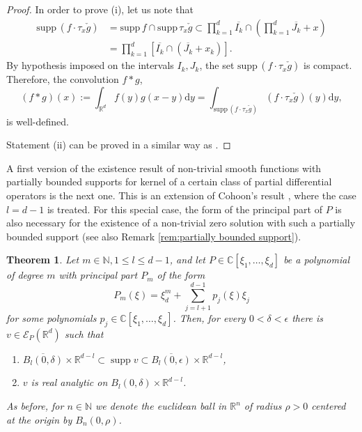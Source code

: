 \documentclass[a4paper,10pt]{amsart}
\newtheorem{theorem}{Theorem}
\newtheorem*{crucial lemma}{Lemma \ref{lem:nice polynomial2}}
\theoremstyle{definition}
\newcommand{\R}{\mathbb{R}}
\newcommand{\C}{\mathbb{C}}
\newcommand{\N}{\mathbb{N}}
\newcommand{\supp}{\mbox{supp}\,}
\begin{document}
\begin{proof}
	In order to prove (i), let us note that
	\begin{align*}
		\supp(f\cdot\tau_x\check g)&=\supp f\cap\supp \tau_x\check g
		\subset\prod_{k=1}^d \overline{I_k}\cap\left(\prod_{k=1}^d \overline{J_k}+x\right)\\
		&=\prod_{k=1}^d \left[\overline{I_k}\cap (\overline{J_k}+x_k)\right].
	\end{align*}
	By hypothesis imposed on the intervals $I_k, J_k$, the set $\supp(f\cdot\tau_x\check g)$ is compact. Therefore, the convolution $f\ast g$,
	\[(f\ast g)(x)
	:=\int_{\R^d}f(y)g(x-y)\mathrm{d}y
	=\int_{\supp(f\cdot\tau_x\check g)}(f\cdot \tau_x\check g)(y)\mathrm{d}y,\]
	is well-defined.
	
	Statement (ii) can be proved in a similar way as \cite[Theorem 6.30(b)]{Rud-FA}.  
\end{proof}

A first version of the existence result of non-trivial smooth functions with partially bounded supports for kernel of a certain class of partial differential operators is the next one. This is an extension of Cohoon's result \cite[Theorem 1]{Cohoon1970}, where the case $l=d-1$ is treated. For this special case, the form of the principal part of $P$ is also necessary for the existence of a non-trivial zero solution with such a partially bounded support (see also Remark \ref{rem:partially bounded support}). 

\begin{theorem}\label{th:zero solution standard form}
	Let $m\in\N, 1\leq l\leq d-1$, and let $P\in\C[\xi_1,\ldots,\xi_d]$ be a polynomial of degree $m$ with principal part $P_m$ of the form 
    \[P_m(\xi)=\xi_d^m+\sum_{j=l+1}^{d-1}p_j(\xi)\xi_j\]
    for some polynomials $p_j\in\C[\xi_1,\ldots,\xi_d]$.
    Then, for every $0<\delta<\epsilon$ there is $v\in\mathscr{E}_P(\R^d)$ such that
	\begin {enumerate}[{\upshape(i)}]
	\item $\overline{B_{l}(0,\delta)}\times\R^{d-l}\subset\operatorname{supp} v\subset \overline{B_{l}(0,\epsilon)}\times\R^{d-l}$,
	\item $v$ is real analytic on $B_{l}(0,\delta)\times\R^{d-l}$.
	\end{enumerate} 
    As before, for $n\in\N$ we denote the euclidean ball in $\R^n$ of radius $\rho>0$ centered at the origin by $B_n(0,\rho)$.
\end{theorem}
\end{document}
